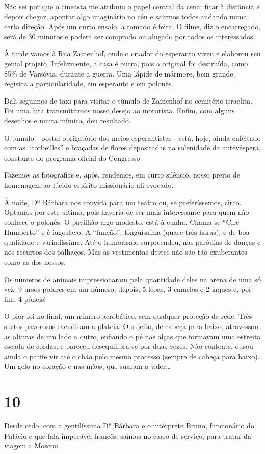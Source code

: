 Não sei por que o cineasta me atribuiu o papel central da cena: ficar à distância e depois chegar, apontar algo imaginário no céu e sairmos todos andando numa certa direção. Após um curto ensaio, a tomado é feita. O filme, diz o encarregado, será de 30 minutos e poderá ser comprado ou alugado por todos os interessados.

À tarde vamos à Rua Zamenhof, onde o criador do esperanto viveu e elaborou seu genial projeto. Infelizmente, a casa é outra, pois a original foi destruída, como 85\% de Varsóvia, durante a guerra. Uma lápide de mármore, bem grande, registra a particularidade, em esperanto e em polonês.

Dali seguimos de taxi para visitar o túmulo de Zamenhof no cemitério israelita. Foi uma luta transmitirmos nosso desejo ao motorista. Enfim, com alguns desenhos e muita mímica, deu resultado.

O túmulo - postal obrigatório dos meios esperantistas - está, hoje, ainda enfeitado com as “corbeilles” e braçadas de flores depositadas na solenidade da antevéspera, constante do programa oficial do Congresso.

Fazemos as fotografias e, após, rendemos, em curto silêncio, nosso preito de homenagem ao lúcido espírito missionário ali evocado.

À noite, Dª Bárbara nos convida para um teatro ou, se preferíssemos, circo. Optamos por este último, pois haveria de ser mais interessante para quem não conhece o polonês. O pavilhão algo modesto, está à cunha. Chama-se “Circ Humberto” e é iugoslavo. A “função”, longuíssima (quase três horas), é de boa qualidade e variadíssima. Até o humorismo surpreendeu, nas paródias de danças e nos recursos dos palhaços. Mas as vestimentas destes não são tão exuberantes como as dos nossos.

Os números de animais impressionaram pela quantidade deles na arena de uma só vez: 9 ursos polares em um número; depois, 5 leoas, 3 camelos e 2 iaques e, por fim, 4 pôneis!

O pior foi no final, um número acrobático, sem qualquer proteção de rede. Três sustos pavorosos sacudiram a plateia. O sujeito, de cabeça para baixo, atravessou as alturas de um lado a outro, enfiando o pé nas alças que formavam uma estreita escada de cordas, e pareceu desequilibra-se por duas vezes. Não contente, ousou ainda o patife vir até o chão pelo mesmo processo (sempre de cabeça para baixo). Um gelo no coração e nas mãos, que suaram a valer\ldots

\section*{10 \adfflatleafright {}}
Desde cedo, com a gentilíssima Dª Bárbara e o intérprete Bruno, funcionário do Palácio e que fala impecável francês, saímos no carro de serviço, para tratar da viagem a Moscou.

